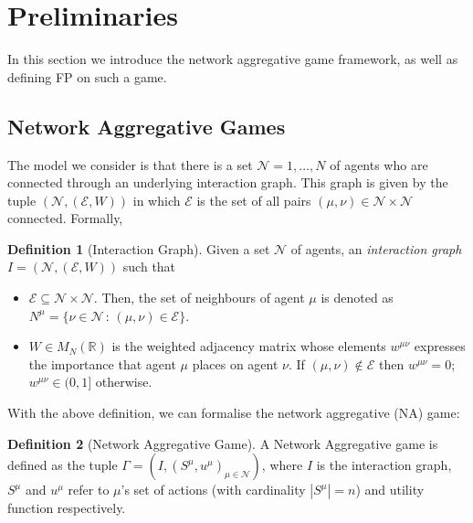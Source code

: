 \documentclass{article}
\theoremstyle{definition}
\newtheorem{definition}{Definition}
\newcommand{\agentset}{\mathcal{N}}
\newcommand{\edgeset}{\mathcal{E}}
\newcommand{\weightset}{W}
\newcommand{\actionset}[1]{S^{#1}}
\newcommand{\utility}[1]{u^{#1}}
\newcommand{\wmunu}{w^{\mu \nu}}
\begin{document}
\section{Preliminaries}
In this section we introduce the network aggregative game framework, as well as defining FP on such a game.

\subsection{Network Aggregative Games}
\label{sec::NAG}

  The model we consider is that there is a set $\agentset = {1,
           \ldots , N}$ of agents who are connected through an underlying
          interaction graph. This graph is given by the tuple
          $(\agentset, (\edgeset, \weightset))$ in which $\edgeset$ is
          the set of all pairs $(\mu, \nu) \in \agentset \times \agentset$
          connected. Formally,
        
  \begin{definition}[Interaction Graph]
    Given a set $\agentset$ of agents, an {\em interaction graph} $I = (\agentset, (\edgeset,
    \weightset))$ such that
    \begin{itemize}
    \item $\edgeset \subseteq \agentset \times \agentset$.        Then, the set of neighbours of agent
        $\mu$ is denoted as $N^\mu = \{\nu \in \agentset \, : \, (\mu, \nu) \in \edgeset\}$.
      \item $\weightset \in M_N(\mathbb{R})$ is the weighted adjacency matrix whose elements $w^{\mu
        \nu}$ expresses the importance that agent $\mu$ places on agent $\nu$. If $(\mu, \nu) \not
        \in \edgeset$ then $w^{\mu \nu} = 0$;        $\wmunu \in (0, 1]$ otherwise.
    \end{itemize}
  \end{definition}

  With the above definition, we can formalise the network aggregative (NA) game:

  \begin{definition}[Network Aggregative Game]
    A Network Aggregative game is defined as the tuple $\Gamma = (I, (\actionset{\mu},
        \utility{\mu})_{\mu \in \mathcal{N}})$, where $I$ is the interaction graph,
        $\actionset{\mu}$ and $\utility{\mu}$ refer to $\mu$'s set of actions (with cardinality
        $|\actionset{\mu}| = n$) and utility function respectively.
  \end{definition}
\end{document}
